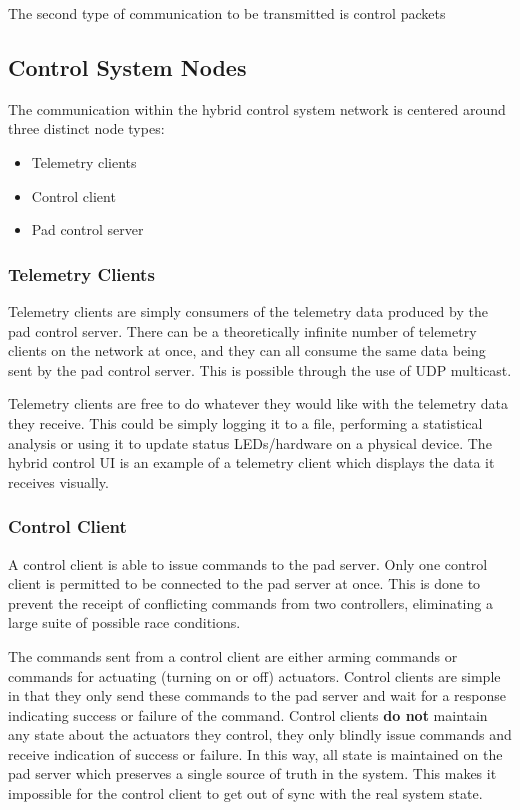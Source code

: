The second type of communication to be transmitted is control packets

\subsection{Control System Nodes}

The communication within the hybrid control system network is centered around three distinct node types:

\begin{itemize}
    \item Telemetry clients
    \item Control client
    \item Pad control server
\end{itemize}

\subsubsection{Telemetry Clients}

Telemetry clients are simply consumers of the telemetry data produced by the pad control server. There can be a
theoretically infinite number of telemetry clients on the network at once, and they can all consume the same data being
sent by the pad control server. This is possible through the use of UDP multicast.

Telemetry clients are free to do whatever they would like with the telemetry data they receive. This could be simply
logging it to a file, performing a statistical analysis or using it to update status LEDs/hardware on a physical device.
The hybrid control UI is an example of a telemetry client which displays the data it receives visually.

\subsubsection{Control Client}

A control client is able to issue commands to the pad server. Only one control client is permitted to be connected to
the pad server at once. This is done to prevent the receipt of conflicting commands from two controllers, eliminating a
large suite of possible race conditions.

The commands sent from a control client are either arming commands or commands for actuating (turning on or off)
actuators. Control clients are simple in that they only send these commands to the pad server and wait for a response
indicating success or failure of the command. Control clients \textbf{do not} maintain any state about the actuators
they control, they only blindly issue commands and receive indication of success or failure. In this way, all state is
maintained on the pad server which preserves a single source of truth in the system. This makes it impossible for the
control client to get out of sync with the real system state.

